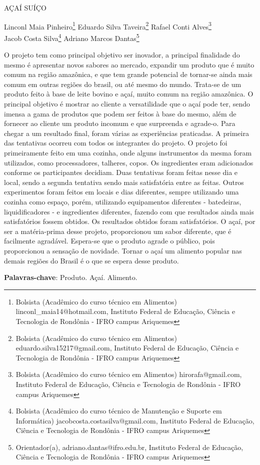 \documentclass[article,12pt,onesidea,4paper,english,brazil]{abntex2}
\begin{document}
	
	
	\frenchspacing 
	
	\begin{center}
		\LARGE AÇAÍ SUÍÇO
		
		\normalsize
		Linconl Maia Pinheiro\footnote{Bolsista (Acadêmico do curso técnico em Alimentos) linconl\_maia14@hotmail.com, Instituto Federal de Educação, Ciência e Tecnologia de Rondônia - IFRO campus Ariquemes} 
		Eduardo Silva Taveira\footnote{Bolsista (Acadêmico do curso técnico em Alimentos) eduardo.silva15217@gmail.com, Instituto Federal de Educação, Ciência e Tecnologia de Rondônia - IFRO campus Ariquemes} 
		Rafael Conti Alves\footnote{Bolsista (Acadêmico do curso técnico em Alimentos) hirorafa@gmail.com, Instituto Federal de Educação, Ciência e Tecnologia de Rondônia - IFRO campus Ariquemes} \\
		Jacob Costa Silva\footnote{Bolsista (Acadêmico do curso técnico de Manutenção e Suporte em Informática) jacobcosta.costasilva@gmail.com, Instituto Federal de Educação, Ciência e Tecnologia de Rondônia - IFRO campus Ariquemes}
		Adriano Marcos Dantas\footnote{Orientador(a), adriano.dantas@ifro.edu.br, Instituto Federal de Educação, Ciência e Tecnologia de Rondônia - IFRO campus Ariquemes} 
	\end{center}
	
	\noindent O projeto tem como principal objetivo ser inovador, a principal finalidade do mesmo é apresentar novos sabores ao mercado, expandir um produto que é muito comum na região amazônica, e que tem grande potencial de tornar-se ainda mais comum em outras regiões do brasil, ou até mesmo do mundo. Trata-se de um produto feito à base de leite bovino e açaí, muito comum na região amazônica. O principal objetivo é mostrar ao cliente a versatilidade que o açaí pode ter, sendo imensa a gama de produtos que podem ser feitos à base do mesmo, além de fornecer ao cliente um produto incomum e que surpreenda e agrade-o. Para chegar a um resultado final, foram várias as experiências praticadas. A primeira das tentativas ocorreu com todos os integrantes do projeto. O projeto foi primeiramente feito em uma cozinha, onde alguns instrumentos da mesma foram utilizados, como processadores, talheres, copos. Os ingredientes eram adicionados conforme os participantes decidiam. Duas tentativas foram feitas nesse dia e local, sendo a segunda tentativa sendo mais satisfatória entre as feitas. Outros experimentos foram feitos em locais e dias diferentes, sempre utilizando uma cozinha como espaço, porém, utilizando equipamentos diferentes - batedeiras, liquidificadores - e ingredientes diferentes, fazendo com que resultados ainda mais satisfatórios fossem obtidos. Os resultados obtidos foram satisfatórios. O açaí, por ser a matéria-prima desse projeto, proporcionou um sabor diferente, que é facilmente agradável. Espera-se que o produto agrade o público, pois proporcionou a sensação de novidade. Tornar o açaí um alimento popular nas demais regiões do Brasil é o que se espera desse produto.
	
	\vspace{\onelineskip}
	
	\noindent
	\textbf{Palavras-chave}: Produto. Açaí. Alimento.
	
\end{document}
